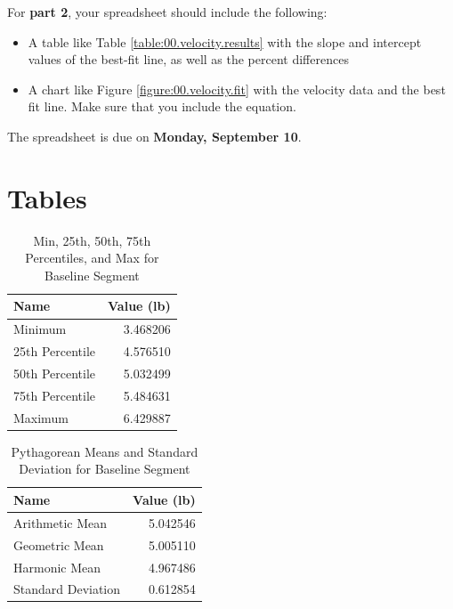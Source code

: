 For \textbf{part 2}, your spreadsheet should include the following:
\begin{itemize}
    \item A table like Table \ref{table:00.velocity.results} with the slope and intercept values of the best-fit line, as well as the percent differences
    \item A chart like Figure \ref{figure:00.velocity.fit} with the velocity data and the best fit line. Make sure that you include the equation.
\end{itemize}
The spreadsheet is due on \textbf{Monday, September 10}.
\newpage
\section{Tables}
\begin{table}[ht]
    \centering
	\begin{tabular}{|l|r|} \hline
        \textbf{Name} & \textbf{Value (lb)} \\
        \hline
		Minimum & 3.468206 \\
		25th Percentile & 4.576510 \\
		50th Percentile & 5.032499 \\
		75th Percentile & 5.484631 \\
		Maximum & 6.429887 \\
		\hline
	\end{tabular}
    \caption{Min, 25th, 50th, 75th Percentiles, and Max for Baseline Segment}
    \label{table:00.baseline.descriptive}
\end{table}
\begin{table}[ht]
    \centering
	\begin{tabular}{|l|r|} \hline
		\textbf{Name} & \textbf{Value (lb)} \\
        \hline
		Arithmetic Mean & 5.042546 \\
		Geometric Mean & 5.005110 \\
        Harmonic Mean & 4.967486 \\
        \hline
        Standard Deviation & 0.612854 \\
		\hline
	\end{tabular}
    \caption{Pythagorean Means and Standard Deviation for Baseline Segment}
    \label{table:00.baseline.means}
\end{table}
